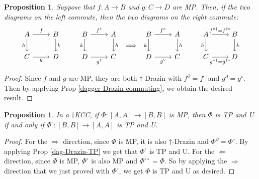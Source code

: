 \documentclass[submission,copyright,creativecommons]{eptcs}
\newtheorem{proposition}[observation]{Proposition}
\begin{document}
\begin{proposition}\label{MP-commuting} Suppose that $f: A \to B$ and $g: C \to D$ are MP. Then, if the two diagrams on the left commute, then the two diagrams on the right commute: 
\vspace{-0.3cm}
\[ \begin{array}[c]{c} \begin{tikzcd}
	A & B & B & A \\
	C & D & D & C
	\arrow["f", from=1-1, to=1-2]
	\arrow["h"', from=1-1, to=2-1]
	\arrow["k", from=1-2, to=2-2]
	\arrow["{f^\dagger}", from=1-3, to=1-4]
	\arrow["k"', from=1-3, to=2-3]
	\arrow["h", from=1-4, to=2-4]
	\arrow["g"', from=2-1, to=2-2]
	\arrow["{g^\dagger}"', from=2-3, to=2-4]
\end{tikzcd} \end{array} \Longrightarrow \begin{array}[c]{c} \begin{tikzcd}
	B & A & A & B \\
	D & C & C & D
	\arrow["{f^\circ}", from=1-1, to=1-2]
	\arrow["k"', from=1-1, to=2-1]
	\arrow["h", from=1-2, to=2-2]
	\arrow["{f^{\circ\dagger}= f^{\dagger\circ}}", from=1-3, to=1-4]
	\arrow["h"', from=1-3, to=2-3]
	\arrow["k", from=1-4, to=2-4]
	\arrow["{g^\circ}"', from=2-1, to=2-2]
	\arrow["{g^{\circ\dagger}= g^{\dagger\circ}}"', from=2-3, to=2-4]
\end{tikzcd} \end{array} \]
\end{proposition}
\begin{proof} Since $f$ and $g$ are MP, they are both $\dagger$-Drazin with $f^\partial= f^\circ$ and $g^\partial=g^\circ$. Then by applying Prop \ref{dagger-Drazin-commuting}, we obtain the desired result. 
\end{proof}

\begin{proposition}\label{MP-TP} In a $\dagger$KCC, if $\Phi: {[A,A]} \to {[B,B]}$ is MP, then $\Phi$ is TP and U if and only if $\Phi^\circ: {[B,B]} \to {[A,A]}$ is TP and U. 
\end{proposition}
\begin{proof} For the $\Rightarrow$ direction, since $\Phi$ is MP, it is also $\dagger$-Drazin and $\Phi^\partial=\Phi^\circ$. By applying Prop \ref{dag-Drazin-TP} we get that $\Phi^\circ$ is TP and U. For the $\Leftarrow$ direction, since $\Phi$ is MP, $\Phi^{\circ}$ is also MP and $\Phi^{\circ\circ} = \Phi$. So by applying the $\Rightarrow$ direction that we just proved with $\Phi^\circ$, we get $\Phi$ is TP and U as desired. 
\end{proof}
\end{document}
